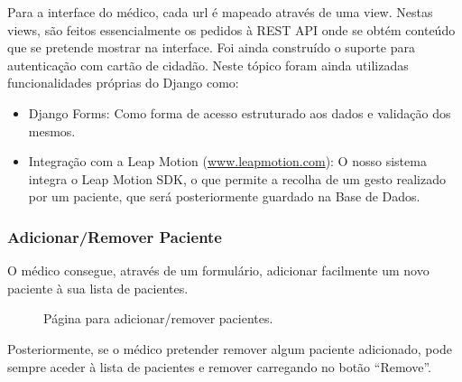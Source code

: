 \documentclass{TTUPhD}
\begin{document}
Para a interface do médico, cada url é mapeado através de uma view. Nestas views, são feitos essencialmente os pedidos à REST API onde se obtém conteúdo que se pretende mostrar na interface. Foi ainda construído o suporte para autenticação com cartão de cidadão. Neste tópico foram ainda utilizadas funcionalidades próprias do Django como:

\begin{itemize}
    \item Django Forms: Como forma de acesso estruturado aos dados e validação dos mesmos.
    \item Integração com a Leap Motion (\url{www.leapmotion.com}): O nosso sistema integra o  Leap Motion SDK, o que permite a recolha de um gesto realizado por um paciente, que será posteriormente guardado na Base de Dados.
\end{itemize}

\subsubsection{Adicionar/Remover Paciente}
O médico consegue, através de um formulário, adicionar facilmente um novo paciente à sua lista de pacientes.

\begin{figure}[h!]
    \center
    \caption{Página para adicionar/remover pacientes.}
    \label{fig:doctor1}
\end{figure}

Posteriormente, se o médico pretender remover algum paciente adicionado, pode sempre aceder à lista de pacientes e remover carregando no botão “Remove”.
\end{document}
